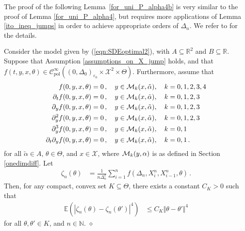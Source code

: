 \documentclass[11pt,a4paper]{article}
\newcommand{\xtl}{{X^n_{i-1}}}
\newcommand{\xtr}{X^n_i}
\newcommand{\EE}{{\mathbb E}}
\newcommand{\RR}{{\mathbb R}}
\newcommand{\NN}{{\mathbb N}}
\newcommand{\cc}{{\mathcal{C}}}
\newcommand{\xx}{{\mathcal{X}}}
\newcommand{\dqed}{{\leavevmode \unskip \penalty9999 \hbox{} \nobreak \hfill \quad \hbox{$\diamond$}}}
\numberwithin{equation}{section}
\numberwithin{theorem}{section}
\begin{document}
%
The proof of the following Lemma~\ref{for_uni_P_alpha4b} is very similar to the proof of Lemma
\ref{for_uni_P_alpha4}, but requires more applications of Lemma
\ref{ito_ineq_jumps} in order to achieve appropriate orders of
$\Delta_n$. We refer to \cite[Section 3.A.3]{phdthesis} for the
details.
%
\begin{lemma}
Consider the model given by (\ref{eqn:SDEoptimal2}), with $A\subseteq\RR^2$ and $B\subseteq \RR$. Suppose that Assumption
\ref{assumptions_on_X_jump} holds,
%
and that $f(t,y,x, \theta) \in
\cc^\infty_\text{pol}((0,\Delta_0)_{\varepsilon_0} \times \xx^2 \times
\Theta)$. Furthermore, assume that
%
\begin{align*}
f(0,y,x, \theta) &=0\,, \quad y \in {\cal M}_k(x,\tilde \alpha), \quad k=0,1,2,3,4\\
\partial_t f(0,y,x, \theta) &=0\,,\quad y \in {\cal M}_k(x,\tilde \alpha), \quad 
                                                           k=0,1,2,3\\
\partial_y f(0,y,x, \theta) &=0\,,\quad y \in {\cal M}_k(x,\tilde \alpha), \quad 
                                                           k=0,1,2,3\\
\partial_y^2 f(0,y,x, \theta) &=0\,,\quad y \in {\cal M}_k(x,\tilde \alpha), \quad 
                                                             k=0,1,2,3\\
\partial_y^3 f(0,y,x, \theta) &=0\,,\quad y \in {\cal M}_k(x,\tilde \alpha), \quad 
                                                             k=0,1\\
\partial_t\partial_y f(0,y,x, \theta) &=0\,,\quad y \in {\cal M}_k(x,\tilde \alpha), \quad 
                                                           k=0,1\,.
\end{align*}
for all $\tilde \alpha \in A$, $\theta \in \Theta$, and $x\in \xx$, 
where ${\cal M}_k(y,\alpha)$ is as defined in Section
\ref{onedimdiff}. Let
\begin{align*}
\zeta_n(\theta) &= \frac{1}{n\Delta_n^2} \sum_{i=1}^n f(\Delta_n, \xtr, \xtl, \theta)\,.
\end{align*}
%
Then, for any compact, convex set $K\subseteq \Theta$, there exists a constant $C_{K}>0$ such that 
\begin{align*}
\EE\left( |\zeta_n(\theta)-\zeta_n(\theta')|^4\right)
&\leq C_{K} \Vert \theta-\theta' \Vert^4
\end{align*}
%
for all $\theta, \theta' \in K$, and $n \in \NN$.\dqed
%
\label{for_uni_P_alpha4b}
\end{lemma}
\end{document}
